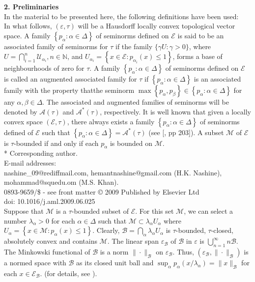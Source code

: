 \documentclass[12pt,a4paper,two side]{article}
\begin{document}
\textbf{2. Preliminaries}\\

In the material to be presented here, the following definitions have been used:\\

 In what follows, $(\varepsilon, \tau)$ will be a Hausdorff locally convex topological vector space. A family $\left\{p_\alpha: \alpha \in \Delta\right\}$ of seminorms defined on $\mathcal{E}$ is said to be an associated family of seminorms for $\tau$ if the family $\{\gamma U: \gamma>0\}$, where $U=\bigcap_{i=1}^n \mathcal{U}_{\alpha_i}, n \in \mathbb{N}$, and $U_{\alpha_i}=\left\{x \in \mathcal{E}: p_{\alpha_i}(x) \leq 1\right\}$, forms a base of neighbourhoods of zero for $\tau$. A family $\left\{p_\alpha: \alpha \in \Delta\right\}$ of seminorms defined on $\mathcal{E}$ is called an augmented associated family for $\tau$ if $\left\{p_\alpha: \alpha \in \Delta\right\}$ is an associated family with the property thatthe seminorm $\max \left\{p_\alpha, p_\beta\right\} \in\left\{p_\alpha: \alpha \in \Delta\right\}$ for any $\alpha, \beta \in \Delta$. The associated and augmented families of seminorms will be denoted by $\mathcal{A}(\tau)$ and $\mathcal{A}^*(\tau)$, respectively. It is well known that given a locally convex space $(\mathcal{E}, \tau)$, there always exists a family $\left\{p_\alpha: \alpha \in \Delta\right\}$ of seminorms defined of $\mathcal{E}$ such that $\left\{p_\alpha: \alpha \in \Delta\right\}=\mathcal{A}^*(\tau)$ (see [\cite{citation-key8}, pp 203]). A subset $\mathcal{M}$ of $\mathcal{E}$ is $\tau$-bounded if and only if each $p_\alpha$ is bounded on $\mathcal{M}$.\\
\newpage
 * Corresponding author.\\
E-mail addresses:\\
nashine\_09@rediffmail.com, hemantnashine@gmail.com 
(H.K. Nashine),\\
mohammad@squedu.om (M.S. Khan).\\
0893-9659/\$ - see front matter © 2009 Published by Elsevier Ltd\\
doi: 10.1016/j.aml.2009.06.025\\

 Suppose that $\mathcal{M}$ is a $\tau$-bounded subset of $\mathcal{E}$. For this set $\mathcal{M}$, we can select a number $\lambda_\alpha>0$ for each $\alpha \in \Delta$ such that $\mathcal{M} \subset \lambda_\alpha U_\alpha$ where $U_\alpha=\left\{x \in \mathcal{M}: p_\alpha(x) \leq 1\right\}$. Clearly, $\mathscr{B}=\bigcap_\alpha \lambda_\alpha U_\alpha$ is $\tau$-bounded, $\tau$-closed, absolutely convex and contains $\mathcal{M}$. The linear span $\varepsilon_{\mathscr{B}}$ of $\mathscr{B}$ in $\mathcal{\varepsilon}$ is $\bigcup_{n=1}^{\infty} n \mathscr{B}$. The Minkowski functional of $\mathscr{B}$ is a norm $\|\cdot\|_{\mathcal{B}}$ on $\varepsilon_{\mathscr{B}}$. Thus, $\left(\varepsilon_{\mathcal{B}},\|\cdot\|_{\mathcal{B}}\right)$ is a normed space with $\mathscr{B}$ as its closed unit ball and $\sup _\alpha p_\alpha\left(x / \lambda_\alpha\right)=\|x\|_{\mathcal{B}}$ for each $x \in \mathcal{E}_{\mathscr{B}}$. 
 (for details, see  \cite{citation-key9,citation-key10,citation-key11}).\\
\end{document}
